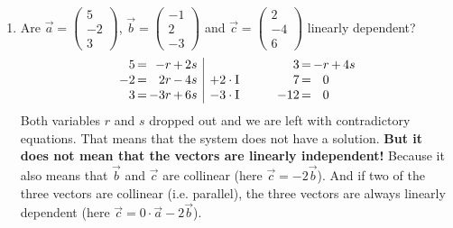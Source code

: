 \documentclass[12pt,eng]{skript_ogg}
\begin{document}
\begin{beispiel}
\begin{enumerate}
\bigskip

\item Are $\vec{a}=\begin{pmatrix}5\\-2\\3
\end{pmatrix}$, $\vec{b}=\begin{pmatrix}-1\\2\\-3
\end{pmatrix}$ and $\vec{c}=\begin{pmatrix}2\\-4\\6
\end{pmatrix}$ linearly dependent?
\[\begin{array}{r@{\,}c@{\,}r@{\,}c@{\,}r|l}
5 & = & -r & + & 2s &\\
-2 & = & 2r & - & 4s & +2\cdot\mbox{I}\\
3 & = & -3r & + & 6s & -3\cdot\mbox{I}\end{array}\qquad\begin{array}{r@{\,}c@{\,}r@{\,}c@{\,}r}
3 & = & -r & + & 4s\\
7 & = & 0 & & \\
-12 & = & 0 & & 
\end{array}\]
Both variables $r$ and $s$ dropped out and we are left with contradictory equations. That means that the system does not have a solution. \textbf{But it does not mean that the vectors are linearly independent!} Because it also means that $\vec{b}$ and $\vec{c}$ are collinear (here $\vec{c}=-2\vec{b}$). And if two of the three vectors are collinear (i.e. parallel), the three vectors are always linearly dependent (here $\vec{c}=0\cdot\vec{a}-2\vec{b}$).
\end{enumerate}
\end{beispiel}
\end{document}

